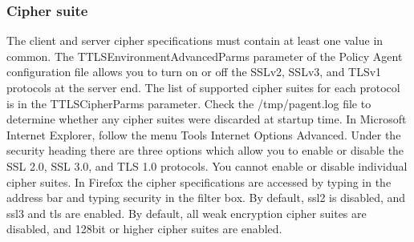 \documentclass[letterpaper,10pt,english]{sphinxmanual}
\begin{document}
\subsubsection{Cipher suite}
\label{\detokenize{Customization:cipher-suite}}
\sphinxAtStartPar
The client and server cipher specifications must contain at least one value in common. The TTLSEnvironmentAdvancedParms parameter of the Policy Agent configuration file allows you to turn on or off the SSLv2, SSLv3, and TLSv1 protocols at the server end. The list of supported cipher suites for each protocol is in the TTLSCipherParms parameter. Check the /tmp/pagent.log file to determine whether any cipher suites were discarded at startup time. In Microsoft Internet Explorer, follow the menu Tools \textendash{} Internet Options \textendash{} Advanced. Under the security heading there are three options which allow you to enable or disable the SSL 2.0, SSL 3.0, and TLS 1.0 protocols. You cannot enable or disable individual cipher suites.
In Firefox the cipher specifications are accessed by typing  in the address bar and typing security in the filter box. By default, ssl2 is disabled, and ssl3 and tls are enabled. By default, all weak encryption cipher suites are disabled, and 128\sphinxhyphen{}bit or higher cipher suites are enabled.
\end{document}
